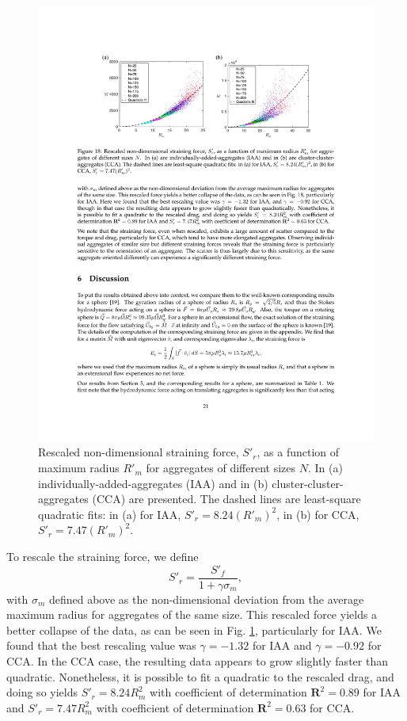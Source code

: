 \begin{figure}[ht]
	\begin{center}
		\includegraphics[scale = 1.0]{./figures/fig_strain_all_rescaledprime.pdf}
	\end{center}
	\caption{Rescaled non-dimensional straining force, $S'_r$, as a function of maximum radius $R'_m$ for aggregates of different sizes $N$. In (a) individually-added-aggregates (IAA) and in (b) cluster-cluster-aggregates (CCA) are presented. The dashed lines are least-square quadratic fits: in (a) for IAA, $S'_r = 8.24  (R'_m)^2 $, in (b) for CCA, $S'_r = 7.47 (R'_m)^2 $. }
	\label{fig_strain_maxR_rescaled}
\end{figure}


To rescale the straining force, we define
\[
S'_r = \frac{S'_f}{1 + \gamma \sigma_m},
\label{eq_strain_rescaled}
\]
with $\sigma_m$ defined above as the non-dimensional deviation from the average maximum radius for aggregates of the same size.
This rescaled force yields a better collapse of the data, as can be seen in Fig. \ref{fig_strain_maxR_rescaled}, particularly for IAA. We found that the best rescaling value was $\gamma = -1.32$ for  IAA and $\gamma= -0.92$ for  CCA.  In the CCA case, the resulting data appears to grow slightly faster than quadratic. Nonetheless, it is possible to fit a quadratic to the rescaled drag, and doing so yields $S'_r = 8.24 R_m^2 $ with coefficient of determination $\mathbf{R}^2=0.89$ for IAA and $S'_r = 7.47 R_m^2 $ with coefficient of determination $\mathbf{R}^2=0.63$ for CCA. 


